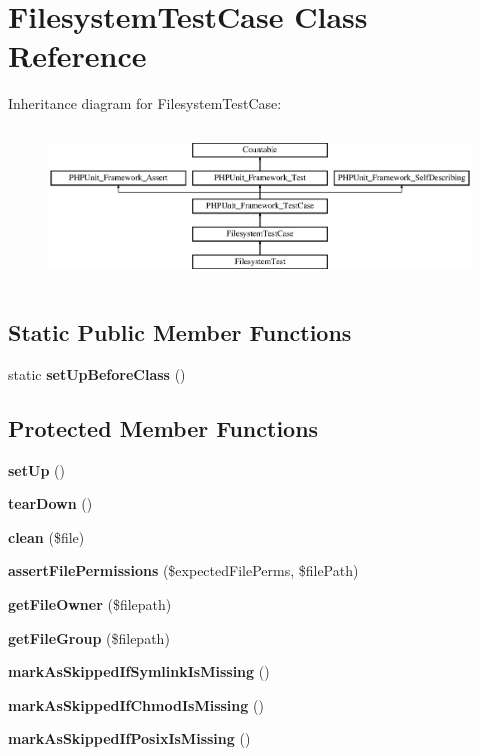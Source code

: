 \section{Filesystem\+Test\+Case Class Reference}
\label{class_symfony_1_1_component_1_1_filesystem_1_1_tests_1_1_filesystem_test_case}
Inheritance diagram for Filesystem\+Test\+Case\+:\begin{figure}[H]
\begin{center}
\leavevmode
\includegraphics[height=4.129793cm]{class_symfony_1_1_component_1_1_filesystem_1_1_tests_1_1_filesystem_test_case}
\end{center}
\end{figure}
\subsection*{Static Public Member Functions}
\begin{DoxyCompactItemize}
\item 
static {\bf set\+Up\+Before\+Class} ()
\end{DoxyCompactItemize}
\subsection*{Protected Member Functions}
\begin{DoxyCompactItemize}
\item 
{\bf set\+Up} ()
\item 
{\bf tear\+Down} ()
\item 
{\bf clean} (\$file)
\item 
{\bf assert\+File\+Permissions} (\$expected\+File\+Perms, \$file\+Path)
\item 
{\bf get\+File\+Owner} (\$filepath)
\item 
{\bf get\+File\+Group} (\$filepath)
\item 
{\bf mark\+As\+Skipped\+If\+Symlink\+Is\+Missing} ()
\item 
{\bf mark\+As\+Skipped\+If\+Chmod\+Is\+Missing} ()
\item 
{\bf mark\+As\+Skipped\+If\+Posix\+Is\+Missing} ()
\end{DoxyCompactItemize}
